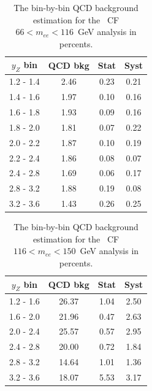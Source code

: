\begin{table}
\centering
\begin{tabular}{ cccc } \hline \hline
 $y_Z$ bin & QCD bkg & Stat & Syst \\  \hline
 1.2 -  1.4 &   2.46 &   0.23  &   0.21 \\
 1.4 -  1.6 &   1.97 &   0.10  &   0.16 \\
 1.6 -  1.8 &   1.93 &   0.09  &   0.16 \\
 1.8 -  2.0 &   1.81 &   0.07  &   0.22 \\
 2.0 -  2.2 &   1.87 &   0.10  &   0.19 \\
 2.2 -  2.4 &   1.86 &   0.08  &   0.07 \\
 2.4 -  2.8 &   1.69 &   0.06  &   0.17 \\
 2.8 -  3.2 &   1.88 &   0.19  &   0.08 \\
 3.2 -  3.6 &   1.43 &   0.26  &   0.25 \\
\hline \hline
\end{tabular}
\caption{The bin-by-bin QCD background estimation for the \Zee\ CF $66 < m_{ee} < 116$~GeV analysis in percents.}
\label{tab:bkg_qcd_peak_percents}
\end{table}

\begin{table}
\centering
\begin{tabular}{ cccc } \hline \hline
 $y_Z$ bin & QCD bkg & Stat & Syst \\  \hline
 1.2 -  1.6 &  26.37 &   1.04  &   2.50 \\
 1.6 -  2.0 &  21.96 &   0.47  &   2.63 \\
 2.0 -  2.4 &  25.57 &   0.57  &   2.95 \\
 2.4 -  2.8 &  20.00 &   0.72  &   1.84 \\
 2.8 -  3.2 &  14.64 &   1.01  &   1.36 \\
 3.2 -  3.6 &  18.07 &   5.53  &   3.17 \\
\hline \hline
\end{tabular}
\caption{The bin-by-bin QCD background estimation for the \Zee\ CF $116 < m_{ee} < 150$~GeV analysis in percents.}
\label{tab:bkg_qcd_high_percents}
\end{table}

